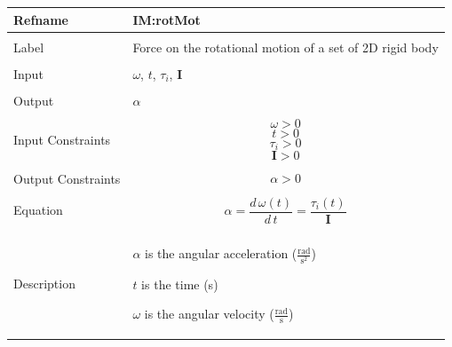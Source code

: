 \documentclass[12pt]{article}
\begin{document}
\noindent \begin{minipage}{\textwidth}
\begin{tabular}{p{} p{}}
\toprule \textbf{Refname} & \textbf{IM:rotMot}
\label{IM:rotMot}
\\ \midrule \\
Label & Force on the rotational motion of a set of 2D rigid body
\\ \midrule \\
Input & $ω$, $t$, ${τ_{i}}$, $\mathbf{I}$
\\ \midrule \\
Output & $α$
\\ \midrule \\
Input Constraints & \begin{displaymath}
                    ω>0
                    \end{displaymath}
                    \begin{displaymath}
                    t>0
                    \end{displaymath}
                    \begin{displaymath}
                    {τ_{i}}>0
                    \end{displaymath}
                    \begin{displaymath}
                    \mathbf{I}>0
                    \end{displaymath}
\\ \midrule \\
Output Constraints & \begin{displaymath}
                     α>0
                     \end{displaymath}
\\ \midrule \\
Equation & \begin{displaymath}
           α=\frac{d\,ω\left(t\right)}{d\,t}=\frac{{τ_{i}}\left(t\right)}{\mathbf{I}}
           \end{displaymath}
\\ \midrule \\
Description & \begin{symbDescription}
              \item{$α$ is the angular acceleration ($\frac{\text{rad}}{\text{s}^{2}}$)}
              \item{$t$ is the time (s)}
              \item{$ω$ is the angular velocity ($\frac{\text{rad}}{\text{s}}$)}

\end{symbDescription}
\end{tabular}
\end{minipage}
\end{document}
